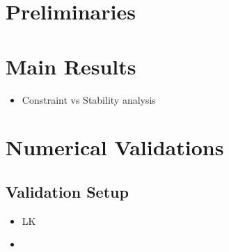 \documentclass[letterpaper, 10 pt, conference]{ieeeconf}
\begin{document}
\section{Preliminaries}

\section{Main Results}

\begin{itemize}
\item Constraint vs Stability analysis
\end{itemize}





\section{Numerical Validations}

\subsection{Validation Setup}


\begin{itemize}
\item LK
\item 
\end{itemize}
\end{document}
